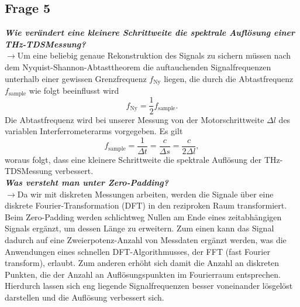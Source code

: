 \subsection{\label{subsec:FZV5}Frage 5}
\textbf{\textit{Wie verändert eine kleinere Schrittweite die spektrale Auflösung einer THz-TDSMessung?}}\\
$\rightarrow$Um eine beliebig genaue Rekonstruktion des Signals zu sichern 
müssen nach dem Nyquist-Shannon-Abtasttheorem die auftauchenden Signalfrequenzen 
unterhalb einer gewissen Grenzfrequenz $f_{\text{Ny}}$ liegen, die durch die 
Abtastfrequenz $f_\text{sample}$ wie folgt beeinflusst wird
\begin{equation}
    f_{\text{Ny}} = \frac{1}{2}f_\text{sample}.
\end{equation}
Die Abtastfrequenz wird bei unserer Messung von der Motorschrittweite $\Delta l$ des variablen 
Interferrometerarms vorgegeben. Es gilt
\begin{equation}
    f_\text{sample} = \frac{1}{\Delta t} = \frac{c}{\Delta s} = \frac{c}{2\Delta l},
\end{equation}
woraus folgt, dass eine kleinere Schrittweite die spektrale Auflösung der THz-TDSMessung
verbessert. \\

\textbf{\textit{Was versteht man unter \glqq Zero-Padding\grqq{}?}}\\
$\rightarrow$Da wir mit diskreten Messungen arbeiten, werden die Signale über eine
diskrete Fourier-Transformation (DFT) in den reziproken Raum transformiert. 
Beim Zero-Padding werden schlichtweg Nullen am Ende eines zeitabhängigen Signals ergänzt, 
um dessen Länge zu erweitern. Zum einen kann das Signal dadurch auf eine Zweierpotenz-Anzahl 
von Messdaten ergänzt werden, was die Anwendungen eines schnellen DFT-Algorithmusses, der 
FFT (fast Fourier transform), erlaubt. Zum anderen erhöht sich damit die Anzahl an diskreten Punkten, 
die der Anzahl an Auflösungspunkten im Fourierraum entsprechen.
Hierdurch lassen sich eng liegende Signalfrequenzen besser voneinander lösgelöst darstellen und die 
Auflösung verbessert sich. 

